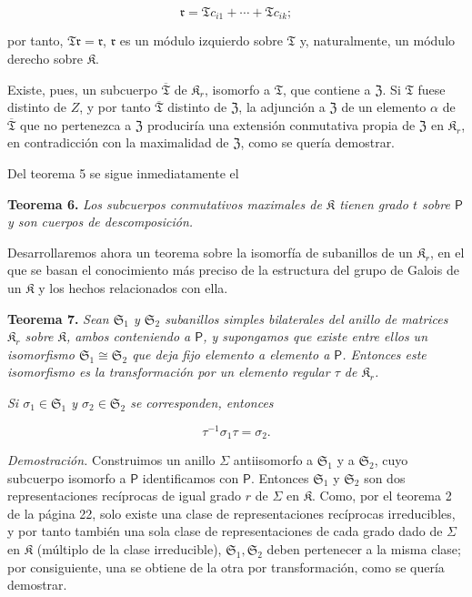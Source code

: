 \[
\mathfrak r=\mathfrak T c_{i1}+\cdots+\mathfrak T c_{ik};
\]

por tanto, \(\mathfrak T\mathfrak r=\mathfrak r\), \(\mathfrak r\) es un módulo izquierdo sobre \(\mathfrak T\) y, naturalmente, un módulo derecho sobre \(\mathfrak K\).

Existe, pues, un subcuerpo \(\overline{\mathfrak T}\) de \(\mathfrak K_r\), isomorfo a \(\mathfrak T\), que contiene a \(\mathfrak Z\). Si \(\mathfrak T\) fuese distinto de \(Z\), y por tanto \(\overline{\mathfrak T}\) distinto de \(\mathfrak Z\), la adjunción a \(\mathfrak Z\) de un elemento \(\alpha\) de \(\overline{\mathfrak T}\) que no pertenezca a \(\mathfrak Z\) produciría una extensión conmutativa propia de \(\mathfrak Z\) en \(\mathfrak K_r\), en contradicción con la maximalidad de \(\mathfrak Z\), como se quería demostrar.

Del teorema 5 se sigue inmediatamente el

\textbf{Teorema 6.} \emph{Los subcuerpos conmutativos maximales de \(\mathfrak K\) tienen grado \(t\) sobre \(\mathsf P\) y son cuerpos de descomposición.}

Desarrollaremos ahora un teorema sobre la isomorfía de subanillos de un \(\mathfrak K_r\), en el que se basan el conocimiento más preciso de la estructura del grupo de Galois de un \(\mathfrak K\) y los hechos relacionados con ella.

\textbf{Teorema 7.} \emph{Sean \(\mathfrak S_1\) y \(\mathfrak S_2\) subanillos simples bilaterales del anillo de matrices \(\mathfrak K_r\) sobre \(\mathfrak K\), ambos conteniendo a \(\mathsf P\), y supongamos que existe entre ellos un isomorfismo \(\mathfrak S_1\cong\mathfrak S_2\) que deja fijo elemento a elemento a \(\mathsf P\). Entonces este isomorfismo es la transformación por un elemento regular \(\tau\) de \(\mathfrak K_r\).}

\emph{Si \(\sigma_1\in\mathfrak S_1\) y \(\sigma_2\in\mathfrak S_2\) se corresponden, entonces}

\[
\tau^{-1}\sigma_1\tau=\sigma_2.
\]

\emph{Demostración.} Construimos un anillo \(\Sigma\) antiisomorfo a \(\mathfrak S_1\) y a \(\mathfrak S_2\), cuyo subcuerpo isomorfo a \(\mathsf P\) identificamos con \(\mathsf P\). Entonces \(\mathfrak S_1\) y \(\mathfrak S_2\) son dos representaciones recíprocas de igual grado \(r\) de \(\Sigma\) en \(\mathfrak K\). Como, por el teorema 2 de la página 22, solo existe una clase de representaciones recíprocas irreducibles, y por tanto también una sola clase de representaciones de cada grado dado de \(\Sigma\) en \(\mathfrak K\) (múltiplo de la clase irreducible), \(\mathfrak S_1,\mathfrak S_2\) deben pertenecer a la misma clase; por consiguiente, una se obtiene de la otra por transformación, como se quería demostrar.

